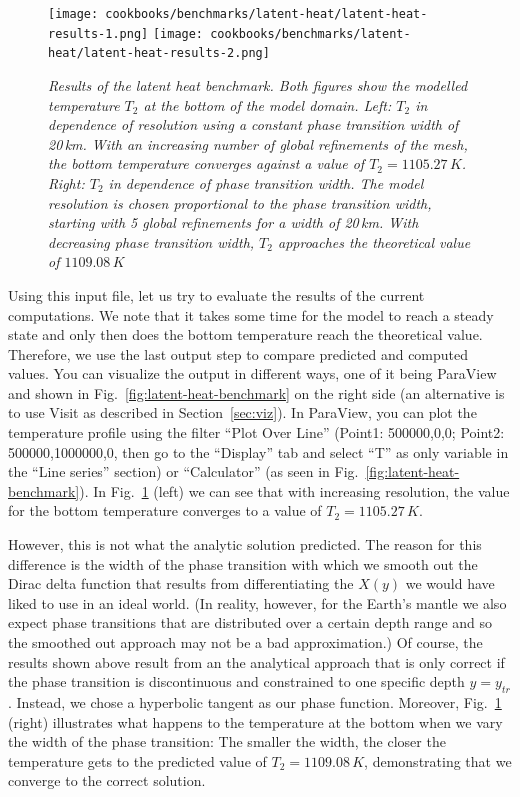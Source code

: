 \documentclass{article}
\begin{document}
\begin{figure}
  \begin{center}
    \texttt{[image: cookbooks/benchmarks/latent-heat/latent-heat-results-1.png]}
    \hfill
    \texttt{[image: cookbooks/benchmarks/latent-heat/latent-heat-results-2.png]}
  \end{center}
  \caption{\it Results of the latent heat benchmark. Both figures show the modelled temperature $T_2$ at the bottom of the model domain.
      Left: $T_2$ in dependence of resolution using a constant phase transition width of 20\,km. With an increasing number of global refinements of the mesh, the bottom temperature converges against a value of $T_2 = 1105.27 \, \si{K}$.
      Right: $T_2$ in dependence of phase transition width. The model resolution is chosen proportional to the phase transition width, starting with 5 global refinements for a width of 20\,km. With decreasing phase transition width, $T_2$ approaches the theoretical value of $1109.08 \, \si{K}$}
  \label{fig:latent-heat-benchmark-results}
\end{figure}

Using this input file, let us try to evaluate the results of the current
computations. We note that it takes some time for the model to reach a steady
state and only then does the bottom temperature reach the theoretical value.
Therefore, we use the last output step to compare predicted and computed values.
You can visualize the output in different ways, one of it being ParaView and shown in
Fig.~\ref{fig:latent-heat-benchmark} on the right side (an alternative is to use Visit as
described in Section~\ref{sec:viz}). In ParaView, you can plot the temperature profile
using the filter ``Plot Over Line'' (Point1: 500000,0,0; Point2:
500000,1000000,0, then go to the ``Display'' tab and select ``T'' as only
variable in the ``Line series'' section) or ``Calculator'' (as seen in
Fig.~\ref{fig:latent-heat-benchmark}). In
Fig.~\ref{fig:latent-heat-benchmark-results} (left) we can see that with
increasing resolution, the value for the bottom temperature converges to a value
of $T_2 = 1105.27 \, \si{K}$. 

However, this is not what the analytic solution
predicted. The reason for this difference is the width of the phase transition
with which we smooth out the Dirac delta function that results from
differentiating the $X(y)$ we would have liked to use in an ideal world.
(In reality, however, for the Earth's mantle we also expect phase transitions
that are distributed over a certain depth range and so the smoothed out
approach may not be a bad approximation.)
Of course, the results shown above result from an the analytical approach that
is only correct if the phase transition is discontinuous and constrained to one
specific depth $y=y_{tr}$. Instead, we chose a hyperbolic
tangent as our phase function. Moreover,
Fig.~\ref{fig:latent-heat-benchmark-results} (right) illustrates what happens to
the temperature at the bottom when we vary the width of the phase transition:
The smaller the width, the closer the temperature gets to the predicted value of
$T_2 = 1109.08 \, \si{K}$, demonstrating that we converge to the correct
solution.
\end{document}
